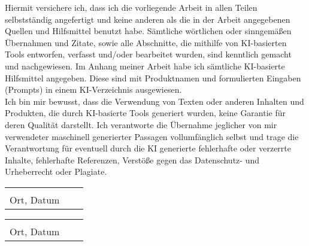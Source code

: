 \documentclass[../main.tex]{subfiles}
\begin{document}
\thispagestyle{empty}

Hiermit versichere ich, dass ich die vorliegende Arbeit in allen Teilen
selbstständig angefertigt und keine anderen als die in der Arbeit angegebenen
Quellen und Hilfsmittel benutzt habe. Sämtliche wörtlichen oder sinngemäßen
Übernahmen und Zitate, sowie alle Abschnitte, die mithilfe von KI-basierten Tools
entworfen, verfasst und/oder bearbeitet wurden, sind kenntlich gemacht und
nachgewiesen. Im Anhang meiner Arbeit habe ich sämtliche KI-basierte
Hilfsmittel angegeben. Diese sind mit Produktnamen und formulierten Eingaben
(Prompts) in einem KI-Verzeichnis ausgewiesen.\\
Ich bin mir bewusst, dass die Verwendung von Texten oder anderen Inhalten und
Produkten, die durch KI-basierte Tools generiert wurden, keine Garantie für
deren Qualität darstellt. Ich verantworte die Übernahme jeglicher von mir
verwendeter maschinell generierter Passagen vollumfänglich selbst und trage die
Verantwortung für eventuell durch die KI generierte fehlerhafte oder verzerrte
Inhalte, fehlerhafte Referenzen, Verstöße gegen das Datenschutz- und
Urheberrecht oder Plagiate.
\vspace{2cm}

\begin{tabular}{lp{2em}l} 
	\hspace{4cm}   && \hspace{4cm} \\\cline{1-1}\cline{3-3} 
	Ort, Datum     && \studentNameOne{}
\end{tabular}

\begin{tabular}{lp{2em}l} 
	\hspace{4cm}   && \hspace{4cm} \\\cline{1-1}\cline{3-3} 
	Ort, Datum     && \studentNameTwo{}
\end{tabular}
\end{document}
